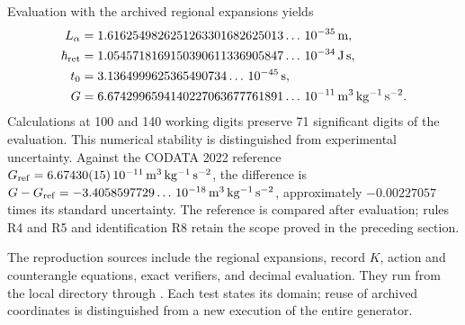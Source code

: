 Evaluation with the archived regional expansions yields
\begin{align*}
 L_\alpha&=1.6162549826251263301682625013\ldots\,10^{-35}\,\mathrm m,\\
 \hbar_{\rm ret}&=1.0545718169150390611336905847\ldots\,10^{-34}\,
                    \mathrm{J\,s},\\
 t_0&=3.1364999625365490734\ldots\,10^{-45}\,\mathrm s,\\
 G&=6.6742996594140227063677761891\ldots\,10^{-11}\,
                    \mathrm{m^3\,kg^{-1}\,s^{-2}}.
\end{align*}
Calculations at 100 and 140 working digits preserve 71 significant
digits of the evaluation. This numerical stability is distinguished
from experimental uncertainty. Against the CODATA 2022 reference
\(G_{\rm ref}=6.67430(15)\,10^{-11}\,\mathrm{m^3\,kg^{-1}\,s^{-2}}\),
the difference is
\(G-G_{\rm ref}=-3.4058597729\ldots\,10^{-18}\,
\mathrm{m^3\,kg^{-1}\,s^{-2}}\), approximately
\(-0.00227057\) times its standard uncertainty. The reference is
compared after evaluation; rules R4 and R5 and identification R8
retain the scope proved in the preceding section.

The reproduction sources include the regional expansions, record \(K\),
action and counterangle equations, exact verifiers, and decimal evaluation.
They run from the local directory
 through
. Each test states its domain; reuse of
archived coordinates is distinguished from a new execution of the entire
generator.
